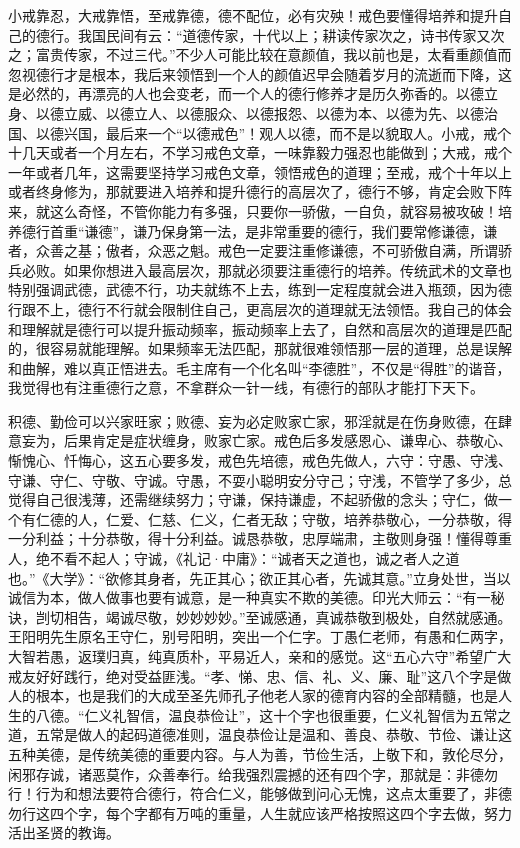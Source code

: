 小戒靠忍，大戒靠悟，至戒靠德，德不配位，必有灾殃！戒色要懂得培养和提升自己的德行。我国民间有云：“道德传家，十代以上；耕读传家次之，诗书传家又次之；富贵传家，不过三代。”不少人可能比较在意颜值，我以前也是，太看重颜值而忽视德行才是根本，我后来领悟到一个人的颜值迟早会随着岁月的流逝而下降，这是必然的，再漂亮的人也会变老，而一个人的德行修养才是历久弥香的。以德立身、以德立威、以德立人、以德服众、以德报怨、以德为本、以德为先、以德治国、以德兴国，最后来一个“以德戒色”！观人以德，而不是以貌取人。小戒，戒个十几天或者一个月左右，不学习戒色文章，一味靠毅力强忍也能做到；大戒，戒个一年或者几年，这需要坚持学习戒色文章，领悟戒色的道理；至戒，戒个十年以上或者终身修为，那就要进入培养和提升德行的高层次了，德行不够，肯定会败下阵来，就这么奇怪，不管你能力有多强，只要你一骄傲，一自负，就容易被攻破！培养德行首重“谦德”，谦乃保身第一法，是非常重要的德行，我们要常修谦德，谦者，众善之基；傲者，众恶之魁。戒色一定要注重修谦德，不可骄傲自满，所谓骄兵必败。如果你想进入最高层次，那就必须要注重德行的培养。传统武术的文章也特别强调武德，武德不行，功夫就练不上去，练到一定程度就会进入瓶颈，因为德行跟不上，德行不行就会限制住自己，更高层次的道理就无法领悟。我自己的体会和理解就是德行可以提升振动频率，振动频率上去了，自然和高层次的道理是匹配的，很容易就能理解。如果频率无法匹配，那就很难领悟那一层的道理，总是误解和曲解，难以真正悟进去。毛主席有一个化名叫“李德胜”，不仅是“得胜”的谐音，我觉得也有注重德行之意，不拿群众一针一线，有德行的部队才能打下天下。

积德、勤俭可以兴家旺家；败德、妄为必定败家亡家，邪淫就是在伤身败德，在肆意妄为，后果肯定是症状缠身，败家亡家。戒色后多发感恩心、谦卑心、恭敬心、惭愧心、忏悔心，这五心要多发，戒色先培德，戒色先做人，六守：守愚、守浅、守谦、守仁、守敬、守诚。守愚，不耍小聪明安分守己；守浅，不管学了多少，总觉得自己很浅薄，还需继续努力；守谦，保持谦虚，不起骄傲的念头；守仁，做一个有仁德的人，仁爱、仁慈、仁义，仁者无敌；守敬，培养恭敬心，一分恭敬，得一分利益；十分恭敬，得十分利益。诚恳恭敬，忠厚端肃，主敬则身强！懂得尊重人，绝不看不起人；守诚，《礼记·中庸》：“诚者天之道也，诚之者人之道也。”《大学》：“欲修其身者，先正其心；欲正其心者，先诚其意。”立身处世，当以诚信为本，做人做事也要有诚意，是一种真实不欺的美德。印光大师云：“有一秘诀，剀切相告，竭诚尽敬，妙妙妙妙。”至诚感通，真诚恭敬到极处，自然就感通。王阳明先生原名王守仁，别号阳明，突出一个仁字。丁愚仁老师，有愚和仁两字，大智若愚，返璞归真，纯真质朴，平易近人，亲和的感觉。这“五心六守”希望广大戒友好好践行，绝对受益匪浅。“孝、悌、忠、信、礼、义、廉、耻”这八个字是做人的根本，也是我们的大成至圣先师孔子他老人家的德育内容的全部精髓，也是人生的八德。“仁义礼智信，温良恭俭让”，这十个字也很重要，仁义礼智信为五常之道，五常是做人的起码道德准则，温良恭俭让是温和、善良、恭敬、节俭、谦让这五种美德，是传统美德的重要内容。与人为善，节俭生活，上敬下和，敦伦尽分，闲邪存诚，诸恶莫作，众善奉行。给我强烈震撼的还有四个字，那就是：非德勿行！行为和想法要符合德行，符合仁义，能够做到问心无愧，这点太重要了，非德勿行这四个字，每个字都有万吨的重量，人生就应该严格按照这四个字去做，努力活出圣贤的教诲。

